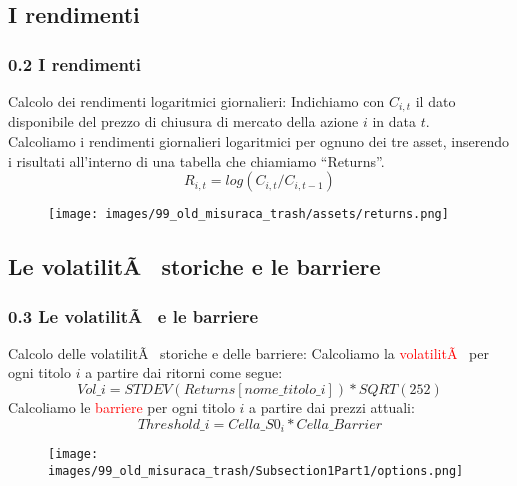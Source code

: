 \subsection[I rendimenti]{I rendimenti}
\begin{frame}

	\frametitle{0.2 I rendimenti}
	
	\begin{block}{Calcolo dei rendimenti logaritmici giornalieri:}
		Indichiamo con $C_{i,t}$ il dato disponibile del prezzo di chiusura di mercato della azione $i$ in data $t$.\\
		Calcoliamo i rendimenti giornalieri logaritmici per ognuno dei tre asset, inserendo i risultati all'interno di una tabella che chiamiamo ``Returns''.
		$$R_{i,t} = log(C_{i,t}/C_{i,t-1})$$
		
	\end{block}
	
	\begin{figure}[!htbp]
		\centering
		\texttt{[image: images/99\_old\_misuraca\_trash/assets/returns.png]}
	\end{figure}
\end{frame}
	

\subsection[Le volatilitÃ  storiche e le barriere]{Le volatilitÃ  storiche e le barriere}
\begin{frame}
	\frametitle{0.3 Le volatilitÃ  e le barriere}

	\begin{block}{Calcolo delle volatilitÃ  storiche e delle barriere:}
		Calcoliamo la \textcolor{red}{volatilitÃ } per ogni titolo $i$ a partire dai ritorni come segue:
		$$Vol\_i = STDEV(Returns[nome\_titolo\_i])*SQRT(252)$$
		Calcoliamo le \textcolor{red}{barriere} per ogni titolo $i$ a partire dai prezzi attuali:
		$$Threshold\_i = Cella\_S0_{i}*Cella\_Barrier$$
	\end{block}
	
	\begin{figure}[!htbp]
		\centering
		\texttt{[image: images/99\_old\_misuraca\_trash/Subsection1Part1/options.png]}
	\end{figure}

\end{frame}

